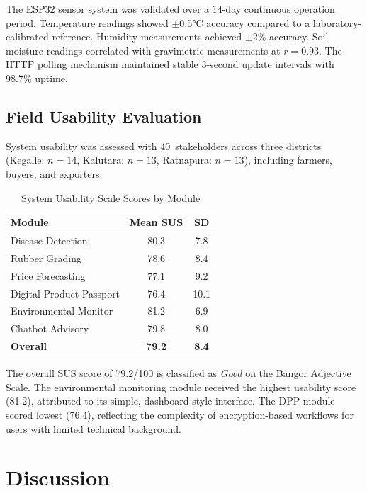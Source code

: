 \documentclass[10pt, conference]{IEEEtran}
\begin{document}
The ESP32 sensor system was validated over a 14-day continuous
operation period. Temperature readings showed $\pm$0.5°C accuracy
compared to a laboratory-calibrated reference. Humidity measurements
achieved $\pm$2\% accuracy. Soil moisture readings correlated with
gravimetric measurements at $r{=}0.93$. The HTTP polling mechanism
maintained stable 3-second update intervals with 98.7\% uptime.

\subsection{Field Usability Evaluation}

System usability was assessed with 40~stakeholders across three
districts (Kegalle: $n{=}14$, Kalutara: $n{=}13$, Ratnapura:
$n{=}13$), including farmers, buyers, and exporters.

\begin{table}[!t]
\centering
\caption{System Usability Scale Scores by Module}
\label{tab:sus}
\begin{tabular}{lcc}
\toprule
\textbf{Module} & \textbf{Mean SUS} & \textbf{SD} \\
\midrule
Disease Detection      & 80.3 & 7.8 \\
Rubber Grading         & 78.6 & 8.4 \\
Price Forecasting      & 77.1 & 9.2 \\
Digital Product Passport & 76.4 & 10.1 \\
Environmental Monitor  & 81.2 & 6.9 \\
Chatbot Advisory       & 79.8 & 8.0 \\
\midrule
\textbf{Overall}       & \textbf{79.2} & \textbf{8.4} \\
\bottomrule
\end{tabular}
\end{table}

The overall SUS score of 79.2/100 is classified as \textit{Good}
on the Bangor Adjective Scale. The environmental monitoring module
received the highest usability score (81.2), attributed to its
simple, dashboard-style interface. The DPP module scored lowest
(76.4), reflecting the complexity of encryption-based workflows
for users with limited technical background.

\section{Discussion}
\end{document}

